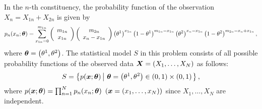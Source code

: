 \documentclass[graybox]{svmult}
\newcommand{\bm}[1]{\mbox{\boldmath $#1$}}
\begin{document}
\noindent
In the $n$-th constituency, the probability function of the observation $X_n=X_{1n}+X_{2n}$ is given by
%
\begin{eqnarray*}
   p_n(x_n;\bm{\theta}) = \sum_{x_{1n}=0}^{m_{1n}}\left(\begin{array}{c}
                                                           m_{1n} \\
                                                           x_{1n}
                                                        \end{array}
                                                  \right)
                                                  \left(\begin{array}{c}
                                                           m_{2n} \\
                                                           x_n - x_{1n}
                                                        \end{array}
                                                  \right)
                          \left(\theta^1\right)^{x_{1n}}\left(1 - \theta^1\right)^{m_{1n}-x_{1n}}
                          \left(\theta^2\right)^{x_n-x_{1n}}\left(1 - \theta^2\right)^{m_{2n}-x_n+x_{1n}},
\end{eqnarray*}
%
where $\bm{\theta}=\left(\theta^1,\theta^2\right)$.
The statistical model $S$ in this problem consists of all possible probability functions of the observed data
$\bm{X}=(X_1,\ldots,X_N)$ as follows:
%
\begin{eqnarray*}
   S = \left\{p(\bm{x};\bm{\theta}) \left| \ \bm{\theta}=\left(\theta^1,\theta^2\right) \in (0,1) \times (0,1)\right.\right\},
\end{eqnarray*}
%
where $p(\bm{x};\bm{\theta})=\prod_{n=1}^{N}p_n(x_n;\bm{\theta}) \ \left(\bm{x}=(x_1,\ldots,x_N)\right)$ since 
$X_1,\ldots,X_N$ are independent.
\end{document}
